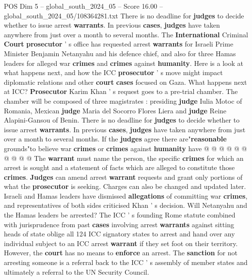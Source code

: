 \begin{textsample}{POS Dim 5 – global\_south\_2024\_05 – Score 16.00 – global\_south\_2024\_05/108364281.txt}  \label{ex:f5_pos_075}
There is no deadline for \textbf{judges} to decide whether to issue arrest \textbf{warrants}.
In previous \textbf{cases}, \textbf{judges} have taken anywhere from just over a month to several months.
The \textbf{International} Criminal \textbf{Court} \textbf{prosecutor} ' s office has requested arrest \textbf{warrants} for Israeli Prime Minister Benjamin Netanyahu and his defence chief, and also for three Hamas leaders for alleged war \textbf{crimes} and \textbf{crimes} against \textbf{humanity}.
Here is a look at what happens next, and how the ICC \textbf{prosecutor} ' s move might impact diplomatic relations and other \textbf{court} \textbf{cases} focused on Gaza.
What happens next at ICC? \textbf{Prosecutor} Karim Khan ' s request goes to a pre-trial chamber.
The chamber will be composed of three magistrates : presiding \textbf{judge} Iulia Motoc of Romania, Mexican \textbf{judge} Maria del Socorro Flores Liera and \textbf{judge} Reine Alapini-Gansou of Benin.
There is no deadline for \textbf{judges} to decide whether to issue arrest \textbf{warrants}.
In previous \textbf{cases}, \textbf{judges} have taken anywhere from just over a month to several months.
If the \textbf{judges} agree there are"\textbf{reasonable} grounds"to believe war \textbf{crimes} or \textbf{crimes} against \textbf{humanity} have @ @ @ @ @ @ @ @ @ @ The \textbf{warrant} must name the person, the specific \textbf{crimes} for which an arrest is sought and a statement of facts which are alleged to constitute those \textbf{crimes}. \textbf{Judges} can amend arrest \textbf{warrant} requests and grant only portions of what the \textbf{prosecutor} is seeking.
Charges can also be changed and updated later.
Israeli and Hamas leaders have dismissed \textbf{allegations} of committing war \textbf{crimes}, and representatives of both sides criticised Khan ' s decision.
Will Netanyahu and the Hamas leaders be arrested?
The ICC ' s founding Rome statute combined with jurisprudence from past \textbf{cases} involving arrest \textbf{warrants} against sitting heads of state oblige all 124 ICC signatory states to arrest and hand over any individual subject to an ICC arrest \textbf{warrant} if they set foot on their territory.
However, the \textbf{court} has no means to \textbf{enforce} an arrest.
The \textbf{sanction} for not arresting someone is a referral back to the ICC ' s assembly of member states and ultimately a referral to the UN Security Council.

\end{textsample}
